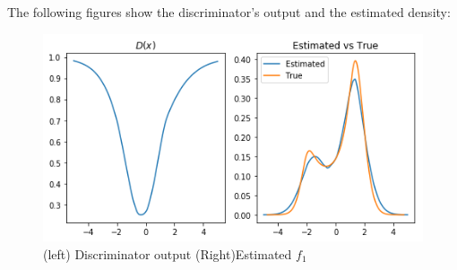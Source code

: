 \begin{enumerate}
The following figures show the discriminator's output and the estimated density:

\begin{figure}[H]
	\centering
	\includegraphics[scale=0.8]{disc.png}
	\caption{(left) Discriminator output (Right)Estimated $f_1$}
	\label{fig:disc}
\end{figure}



\end{enumerate}

